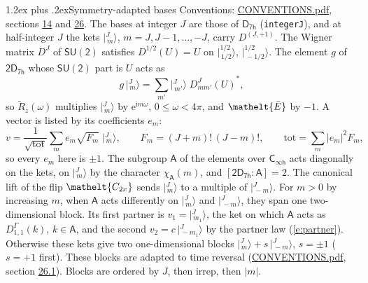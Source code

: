 \documentclass[10pt,a4paper]{article}
\makeatletter
\renewcommand\section{\@startsection{section}{1}{\z@}{-3ex plus -1ex minus -.2ex}%
  {1.2ex plus .2ex}{\normalfont\large\sffamily\bfseries\color{parttitle}}}
\numberwithin{equation}{section}
\newcommand{\eltfont}[1]{{\let\sigma\eltsigma\mathelt{#1}}}
\newcommand{\grp}[1]{\mathsf{#1}}
\newcommand{\elt}[1]{\eltfont{#1}}
\newcommand{\grpindex}[2]{[#1 : #2]}
\newcommand{\iunit}{\mathrm{i}}
\newcommand{\expe}{\mathrm{e}}
\newcommand{\irrJp}[2]{D^{(#1,#2)}}
\newcommand{\repD}[1]{D^{#1}}
\newcommand{\wignerD}[1]{D^{#1}}
\newcommand{\chiA}{\chi_{\grp{A}}}
\newcommand{\conj}[1]{{#1}^{*}}
\newcommand{\jm}[2]{\bigl\lvert{}^{#1}_{\,#2}\bigr\rangle}
\newcommand{\barred}[1]{\bar{#1}}
\newcommand{\lift}[1]{\tilde{#1}}
\makeatother
\begin{document}
\section{Symmetry-adapted bases}\label{s:bases}
Conventions: \href{../../CONVENTIONS.pdf}{CONVENTIONS.pdf}, sections \href{../../../rotation/CONVENTIONS.pdf\#conv.14}{14} and \href{../../CONVENTIONS.pdf\#conv.26}{26}.
\leavevmode\label{n:index.m}\label{n:vector.ket}The bases at integer $J$ are those of \href{../../../rotation/data/pdf/D7h.pdf}{$\grp{D_{7h}}$} (\texttt{integerJ}), and at half-integer $J$ the kets $\jm{J}{m}$, $m = J, J-1, \dots, -J$, carry $\irrJp{J}{+1}$. \label{n:matrix.wigner}The Wigner matrix $\wignerD{J}$ of $\grp{SU(2)}$ satisfies $\wignerD{1/2}(U) = U$ on $\jm{1/2}{1/2}$, $\jm{1/2}{-1/2}$. The element $g$ of $\grp{2D_{7h}}$ whose $\grp{SU(2)}$ part is $U$ acts as
\begin{equation}\label{e:action}g\,\jm{J}{m} = \sum_{m'} \jm{J}{m'}\; \conj{\wignerD{J}_{m m'}(U)},\end{equation}
so $\lift{R}_{z}(\omega)$ multiplies $\jm{J}{m}$ by $\expe^{\iunit m\omega}$, $0 \le \omega < 4\pi$, and $\elt{\barred{E}}$ by $-1$. \label{n:index.ketcoefficient}\label{n:vector.basis.symmetry}\label{n:index.ketweight}\label{n:index.total}A vector is listed by its coefficients $e_m$:
\begin{equation}\label{e:ket}v = \frac{1}{\sqrt{\mathrm{tot}}}\sum_m e_m\sqrt{F_m}\;\jm{J}{m},\qquad F_m = (J+m)!\,(J-m)!,\qquad \mathrm{tot} = \sum_m |e_m|^2F_m,\end{equation}
so every $e_m$ here is $\pm 1$.
\leavevmode\label{n:group.A}\label{n:function.character.abelian}The subgroup $\grp{A}$ of the elements over $\grp{C_{\infty h}}$ acts diagonally on the kets, on $\jm{J}{m}$ by the character $\chiA(m)$, and $\grpindex{\grp{2D_{7h}}}{\grp{A}} = 2$. The canonical lift of the flip $\elt{C_{2x}}$ sends $\jm{J}{m}$ to a multiple of $\jm{J}{-m}$. For $m > 0$ by increasing $m$, when $\grp{A}$ acts differently on $\jm{J}{m}$ and $\jm{J}{-m}$, they span one two-dimensional block. \label{n:index.partner.sign}Its first partner is $v_1 = \jm{J}{m_1}$, the ket on which $\grp{A}$ acts as $\repD{\Gamma}_{1,1}(k)$, $k \in \grp{A}$, and the second $v_2 = c\,\jm{J}{-m_1}$ by the partner law (\ref{e:partner}). \label{n:index.pair.sign}Otherwise these kets give two one-dimensional blocks $\jm{J}{m} + s\,\jm{J}{-m}$, $s = \pm 1$ ($s = +1$ first). These blocks are adapted to time reversal (\href{../../CONVENTIONS.pdf}{CONVENTIONS.pdf}, section \href{../../CONVENTIONS.pdf\#conv.26.1}{26.1}). Blocks are ordered by $J$, then irrep, then $|m|$.
\end{document}
